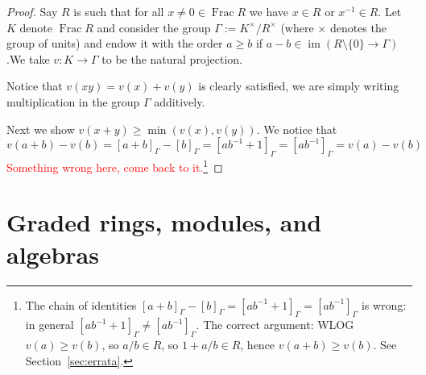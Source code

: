 \documentclass[12pt]{article}
\theoremstyle{plain}
\theoremstyle{definition}
\newcommand{\lto}{\longrightarrow}
\begin{document}
\begin{proof}
Say $R$ is such that for all $x \neq 0 \in \operatorname{Frac}R$ we have $x \in R$ or $x^{-1} \in R$. Let $K$ denote $\operatorname{Frac}R$ and consider the group $\Gamma := K^{\times}/R^\times$ (where $\times$ denotes the group of units) and endow it with the order $a \geq b$ if $a - b \in \operatorname{im}(R\setminus\lbrace 0 \rbrace \lto \Gamma)$.We take $v: K \lto \Gamma$ to be the natural projection. 

Notice that $v(xy) = v(x) + v(y)$ is clearly satisfied, we are simply writing multiplication in the group $\Gamma$ additively.

Next we show $v(x + y) \geq \operatorname{min}(v(x),v(y))$. We notice that
\begin{equation}
v(a + b) - v(b) = [a + b]_\Gamma - [b]_\Gamma = [ab^{-1} + 1]_\Gamma = [ab^{-1}]_\Gamma = v(a) - v(b)
\end{equation}
\textcolor{red}{Something wrong here, come back to it.}\footnote{The chain of identities $[a+b]_\Gamma-[b]_\Gamma=[ab^{-1}+1]_\Gamma=[ab^{-1}]_\Gamma$ is wrong: in general $[ab^{-1}+1]_\Gamma\neq [ab^{-1}]_\Gamma$. The correct argument: WLOG $v(a)\ge v(b)$, so $a/b\in R$, so $1+a/b\in R$, hence $v(a+b)\ge v(b)$. See Section~\ref{sec:errata}.}
\end{proof}
%
%
%
%
%
%
%
\section{Graded rings, modules, and algebras}\label{Sec:Graded}
\end{document}

